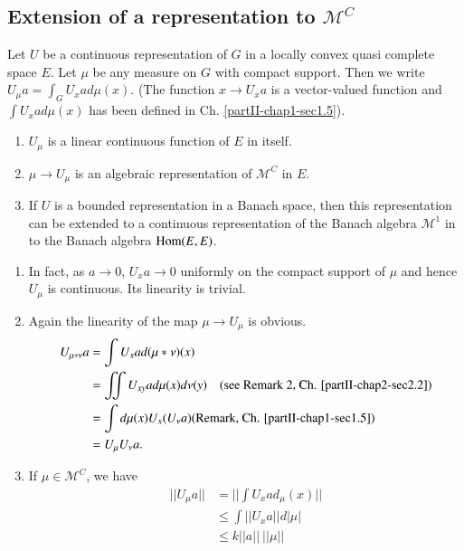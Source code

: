 \subsection{Extension of a  representation to
  $\mathscr{M}^{C}$}\label{partII-chap4-sec4.4}%
 
 Let $U$ be a continuous  representation of $G$ in a locally convex
 quasi complete space $E$. Let $\mu$  be any  measure on $G$ with
 compact support. Then we write $U_{\mu}  a = \int_{G} U_{x} ad \mu
 (x)$. (The function  $x \rightarrow  U_{x} a$ is a vector-valued
 function and $\int U_{x} ad \mu(x)$ has been defined in
 Ch. \ref{partII-chap1-sec1.5}). 
  
\setcounter{thm}{0}
\begin{thm}\label{partII-chap4-thm1}%
 \begin{enumerate} 
\renewcommand{\labelenumi}{\rm(\theenumi)}
\item $U_{\mu}$ {is a linear continuous  function of $E$ in itself}.

\item $\mu \rightarrow U_{\mu}$ {is an algebraic representation
  of} $\mathscr{M}^{C}$ {in} $E$. 

\item {If} $U$ {is a bounded representation in a Banach space,
  then this representation  can be extended to a continuous
  representation of the Banach algebra} $\mathscr{M}^{1}$ {in to  the Banach
  algebra} $\operatorname{Hom}(E,E)$. 
\end{enumerate}
\end{thm}
  
\begin{enumerate}
\renewcommand{\labelenumi}{(\theenumi)}
\item  In fact, as  $a \rightarrow  0$, $U_{x} a  \rightarrow 0$
  uniformly on the compact support of $\mu$ and hence $U_{\mu}$ is
  continuous. Its linearity is trivial. 

\item Again  the linearity of the map $\mu  \rightarrow  U_{\mu}$ is
  obvious.  
\begin{align*}
U_{\mu * \nu } a & = \int U_{x} a d (\mu * \nu ) (x)\\
& =\iint U_{xy}ad \mu (x)d  \nu (y)\quad \text{(see Remark 2,
  Ch. \ref{partII-chap2-sec2.2})}\\ 
& =\int d \mu(x)U_{x}(U_{\nu} a) \text{(Remark, Ch. \ref{partII-chap1-sec1.5})}\\
& =U_{\mu}U_{\nu} a. 
\end{align*}\pageoriginale

\item If $\mu \in \mathscr{M}^{C}$, we have
\begin{align*}
|| U_\mu a ||   & = || \int U_{x} ad_\mu(x)||\\
& \leq \int  || U_{x}a   ||d| \mu |\\ 
& \leq  k|| a  ||~     || \mu  ||
\end{align*}
\end{enumerate}

